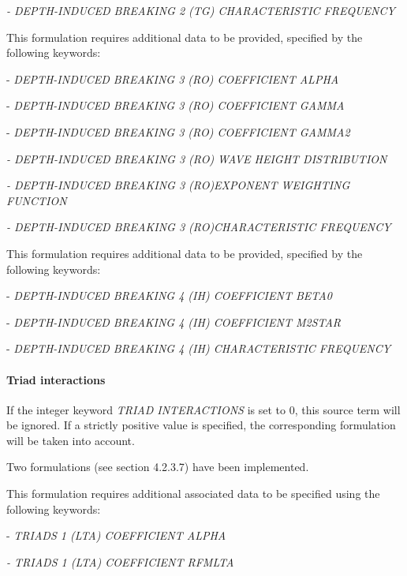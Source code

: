  \textit{- DEPTH-INDUCED BREAKING 2 (TG) CHARACTERISTIC FREQUENCY}

 \textbf{}

 \textbf{}

 This formulation requires additional data to be provided, specified by the following keywords:

 - \textit{DEPTH-INDUCED BREAKING 3 (RO) COEFFICIENT ALPHA}

 - \textit{DEPTH-INDUCED BREAKING 3 (RO) COEFFICIENT GAMMA}

 - \textit{DEPTH-INDUCED BREAKING 3 (RO) COEFFICIENT GAMMA2}

 \textit{- DEPTH-INDUCED BREAKING 3 (RO) WAVE HEIGHT DISTRIBUTION}

 \textit{- DEPTH-INDUCED BREAKING 3 (RO)EXPONENT WEIGHTING FUNCTION}

 \textit{- DEPTH-INDUCED BREAKING 3 (RO)CHARACTERISTIC FREQUENCY}

 \textbf{}

 \textbf{}

 This formulation requires additional data to be provided, specified by the following keywords:

 - \textit{DEPTH-INDUCED BREAKING 4 (IH) COEFFICIENT BETA0}

 - \textit{DEPTH-INDUCED BREAKING 4 (IH) COEFFICIENT M2STAR}

 - \textit{DEPTH-INDUCED BREAKING 4 (IH) CHARACTERISTIC FREQUENCY}

\paragraph{ Triad interactions}

If the integer keyword \textit{TRIAD INTERACTIONS} is set to 0, this source term will be ignored. If a strictly positive value is
specified, the corresponding formulation will be taken into account.

 Two formulations (see section 4.2.3.7) have been implemented.

 \textbf{}

 This formulation requires additional associated data to be specified using the following keywords:

 - \textit{TRIADS 1 (LTA) COEFFICIENT ALPHA }

 \textit{- TRIADS 1 (LTA) COEFFICIENT RFMLTA }

 \textbf{}

